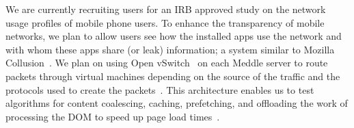 \documentclass{sig-alternate}
\newcommand{\meddle}{{Meddle}\xspace}
\begin{document}
We are currently recruiting users for an IRB approved study on the
network usage profiles of mobile phone users. To enhance the
transparency of mobile networks, we plan to allow users see how
the installed apps use the network and with whom these apps share (or
leak) information; a system similar to Mozilla
Collusion~\cite{collusion}. We plan on using Open
vSwitch~\cite{Openvswitch} on each \meddle server to route packets
through virtual machines depending on the source of the traffic and
the protocols used to create the
packets~\cite{Sekar:2012:ConsolidatedMBox}. This architecture enables
us to test algorithms for content coalescing, caching, prefetching,
and offloading the work of processing the DOM to speed up page load
times~\cite{opera-mini, silk, google-spdy}. 


\begin{small}


\end{small}
\end{document}
